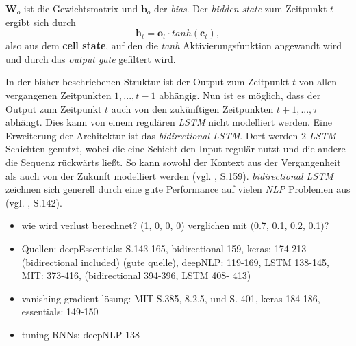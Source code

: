\documentclass[a4paper,11pt]{article}
\begin{document}
$\bm{W}_o$ ist die Gewichtsmatrix und $\bm{b}_o$ der \textit{bias}. Der \textit{hidden state} zum Zeitpunkt $t$ ergibt sich durch
\[\bm{h}_t = \bm{o}_t \cdot tanh(\bm{c}_t) , \]
also aus dem \textbf{cell state}, auf den die \textit{tanh} Aktivierungsfunktion angewandt wird und durch das \textit{output gate} gefiltert wird.  

In der bisher beschriebenen Struktur ist der Output zum Zeitpunkt $t$ von allen vergangenen Zeitpunkten $1,...,t-1$ abhängig. Nun ist es möglich, dass der Output zum Zeitpunkt $t$ auch von den zukünftigen Zeitpunkten $t+1,..., \tau$ abhängt. Dies kann von einem regulären \textit{LSTM} nicht modelliert werden. Eine Erweiterung der Architektur ist das \textit{bidirectional LSTM}. Dort werden $2$ \textit{LSTM} Schichten genutzt, wobei die eine Schicht den Input regulär nutzt und die andere die Sequenz rückwärts ließt. So kann sowohl der Kontext aus der Vergangenheit als auch von der Zukunft modelliert werden (vgl. \cite{deepEssentials}, S.159).
\textit{bidirectional LSTM} zeichnen sich generell durch eine gute Performance auf vielen \textit{NLP} Problemen aus (vgl. \cite{deepNLP}, S.142).



\begin{itemize}
\item wie wird verlust berechnet? (1, 0, 0, 0) verglichen mit (0.7, 0.1, 0.2, 0.1)?
    \item Quellen: deepEssentials: S.143-165, bidirectional 159,  keras: 174-213 (bidirectional included) (gute quelle),  deepNLP: 119-169, LSTM 138-145, MIT: 373-416, (bidirectional 394-396, LSTM 408- 413)
    \item vanishing gradient lösung: MIT S.385, 8.2.5, und S. 401, keras 184-186, essentials: 149-150
    \item tuning RNNs: deepNLP 138
\end{itemize}{}
\end{document}
